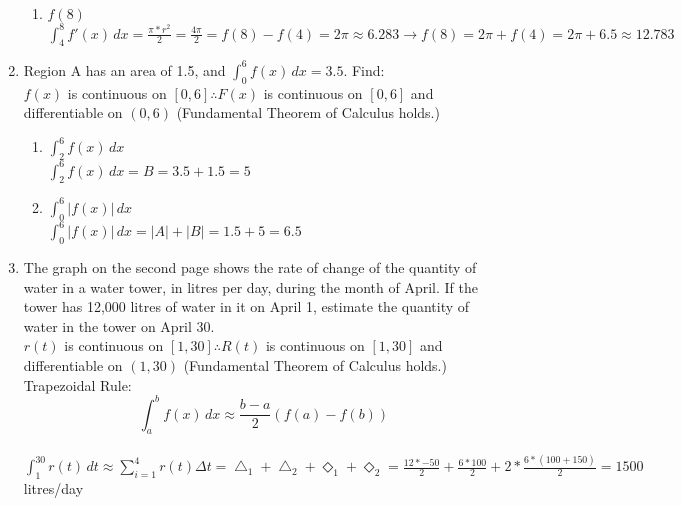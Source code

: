 \documentclass[10pt, letterpaper]{report}
\begin{document}
\begin{enumerate}
\begin{enumerate}
        \item{$f(8)$} \\

          $\int_{4}^{8}{f'(x)}\,dx=
          \frac{\pi*r^{2}}{2}=
          \frac{4\pi}{2}=
          f(8)-f(4)=
          2\pi\approx6.283\rightarrow
          f(8)=2\pi+f(4)=2\pi+6.5\approx12.783$ \\

      \end{enumerate}
    \item{Region A has an area of 1.5, and $\int_{0}^{6}{f(x)}\,dx=3.5$. Find:} \\

      $f(x)$ is continuous on $[0,6]\therefore F(x)$ is continuous on $[0,6]$ and differentiable on $(0,6)$ (Fundamental Theorem of Calculus holds.) \\

      \begin{enumerate}
        \item{$\int_{2}^{6}{f(x)}\,dx$} \\

          $\int_{2}^{6}{f(x)}\,dx=B=3.5+1.5=5$ \\

        \item{$\int_{0}^{6}{|f(x)|}\,dx$} \\

          $\int_{0}^{6}{|f(x)|}\,dx=
          |A|+|B|=1.5+5=6.5$ \\
      \end{enumerate}
    \item{The graph on the second page shows the rate of change of the quantity of water in a water tower, in litres per day, during the month of April. If the tower has 12,000 litres of water in it on April 1, estimate the quantity of water in the tower on April 30.} \\

      $r(t)$ is continuous on $[1,30]\therefore R(t)$ is continuous on $[1,30]$ and differentiable on $(1,30)$ (Fundamental Theorem of Calculus holds.) \\

      Trapezoidal Rule: \[\int_{a}^{b}{f(x)}\,dx\approx\frac{b-a}{2}(f(a)-f(b)) \] \\

      $\int_{1}^{30}{r(t)}\,dt\approx
      \sum_{i=1}^{4}{r(t)}\Delta t=
      \bigtriangleup_1+\bigtriangleup_2+\Diamond_1+\Diamond_2=
      \frac{12*-50}{2}+\frac{6*100}{2}+2*\frac{6*(100+150)}{2}=1500$ litres/day \\


\end{enumerate}
\end{document}
